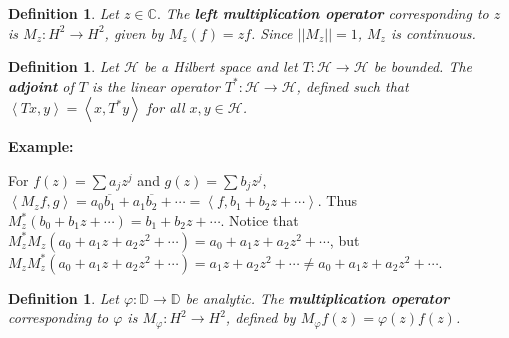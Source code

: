 \documentclass{article}
\theoremstyle{colontheorem}
\newtheorem{definition}[theorem]{Definition}
\newenvironment{Def}
{
	\begin{mdframed}[backgroundcolor=DefGreen!10]
	\begin{definition}
}
{
	\end{definition}
	\end{mdframed}
	
	\vspace{.15in}
}
\newenvironment{Example}
{
	\begin{mdframed}
	\textbf{Example:}%
}
{
	\end{mdframed}
	
	\vspace{.15in}
}
\begin{document}
\begin{Def}
	
	Let $z \in \mathbb{C}.$ The \textbf{left multiplication operator} corresponding to $z$ is $M_z : H^2 \longrightarrow H^2$, given by $M_z (f) = zf$. Since $||M_z|| = 1$, $M_z$ is continuous.
	
\end{Def}



\begin{Def}
	
	Let $\mathcal{H}$ be a Hilbert space and let $T : \mathcal{H} \longrightarrow \mathcal{H}$ be bounded. The \textbf{adjoint} of $T$ is the linear operator $T^* : \mathcal{H} \longrightarrow \mathcal{H}$, defined such that $\left< Tx, y \right>  = \left< x, T^* y \right>$ for all $x, y \in \mathcal{H}$.
	
\end{Def}



\begin{Example}
	For $f(z) = \displaystyle\sum a_j z^j$ and $g(z) = \displaystyle\sum b_j z^j$, $\left< M_z f, g \right> = a_0 \overline{b_1} + a_1 \overline{b_2} + \cdots = \left< f, b_1 + b_2 z + \cdots \right>$. Thus $M_z^* (b_0 + b_1 z + \cdots) = b_1 + b_2 z + \cdots$. Notice that $M_z^* M_z (a_0 + a_1 z + a_2 z^2 + \cdots) = a_0 + a_1 z + a_2 z^2 + \cdots$, but $M_z M_z^* (a_0 + a_1 z + a_2 z^2 + \cdots) = a_1 z + a_2 z^2 + \cdots \neq a_0 + a_1 z + a_2 z^2 + \cdots$.
	
\end{Example}



\begin{Def}
	
	Let $\varphi : \mathbb{D} \longrightarrow \mathbb{D}$ be analytic. The \textbf{multiplication operator} corresponding to $\varphi$ is $M_\varphi : H^2 \longrightarrow H^2$, defined by $M_\varphi f(z) = \varphi(z) f(z)$.
	
\end{Def}
\end{document}
